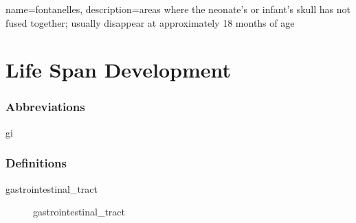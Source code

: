 \documentclass[../../EMT-169.tex]{subfiles}
\begin{document}
\setcounter{chapter}{6}
\label{ch:chapter7}
\clearpage
	
	
	{
		name=fontanelles,
		description={areas where the neonate's or infant's skull has not fused together; usually disappear at approximately 18 months of age}
	}
	
\chapter{Life Span Development}

\subsection*{Abbreviations}
\begin{description}[leftmargin=!,labelwidth=\widthof{\bfseries ABCD}]
	\item [\acrshort{gi}] \acrlong{gi}
\end{description}

\subsection*{Definitions}
\begin{description}	
	\item [\gls{gastrointestinal_tract}] \glsdesc{gastrointestinal_tract}
\end{description}\hfill \\


\clearpage
\end{document}
